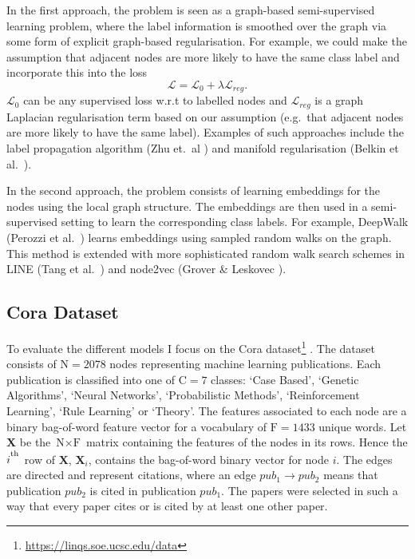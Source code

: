 \documentclass[12pt]{article}
\theoremstyle{definition}
\begin{document}
\bigskip

In the first approach, the problem is seen as a graph-based semi-supervised learning problem, where the label information is smoothed over the graph via some form of explicit graph-based regularisation. For example, we could make the assumption that adjacent nodes are more likely to have the same class label and incorporate this into the loss
\begin{equation}
	\mathcal{L} = \mathcal{L}_0 + \lambda \mathcal{L}_{\mathit{reg}}.
\end{equation}
$\mathcal{L}_0$ can be any supervised loss w.r.t to labelled nodes and $\mathcal{L}_{\mathit{reg}}$ is a graph Laplacian regularisation term based on our assumption (e.g.\ that adjacent nodes are more likely to have the same label). Examples of such approaches include the label propagation algorithm (Zhu et.\ al \cite{zhu2002learning}) and manifold regularisation (Belkin et al.\ \cite{belkin2006manifold}).

\bigskip

In the second approach, the problem consists of learning embeddings for the nodes using the local graph structure. The embeddings are then used in a semi-supervised setting to learn the corresponding class labels. For example, DeepWalk (Perozzi et al.\ \cite{perozzi2014deepwalk}) learns embeddings using sampled random walks on the graph. This method is extended with more sophisticated random walk search schemes in LINE (Tang et al.\ \cite{tang2015line}) and node2vec (Grover \& Leskovec \cite{grover2016node2vec}).


\subsection{Cora Dataset}
To evaluate the different models I focus on the Cora dataset\footnote{\url{https://linqs.soe.ucsc.edu/data}} \cite{cora}. The dataset consists of $\textrm{N} = 2078$ nodes representing machine learning publications. Each publication is classified into one of $\textrm{C} = 7$ classes: `Case Based', `Genetic Algorithms', `Neural Networks', `Probabilistic Methods', `Reinforcement Learning', `Rule Learning' or `Theory'. The features associated to each node are a binary bag-of-word feature vector for a vocabulary of $\textrm{F} = 1433$ unique words. Let $\mathbf{X}$ be the $\textrm{N} \times \textrm{F}$ matrix containing the features of the nodes in its rows. Hence the $i^\textsuperscript{th}$ row of $\mathbf{X}$,  $\mathbf{X}_i$, contains the bag-of-word binary vector for node $i$. The edges are directed and represent citations, where an edge $\mathit{pub_1} \to \mathit{pub_2}$ means that publication $\mathit{pub_2}$ is cited in publication $\mathit{pub_1}$. The papers were selected in such a way that every paper cites or is cited by at least one other paper. 
\end{document}
